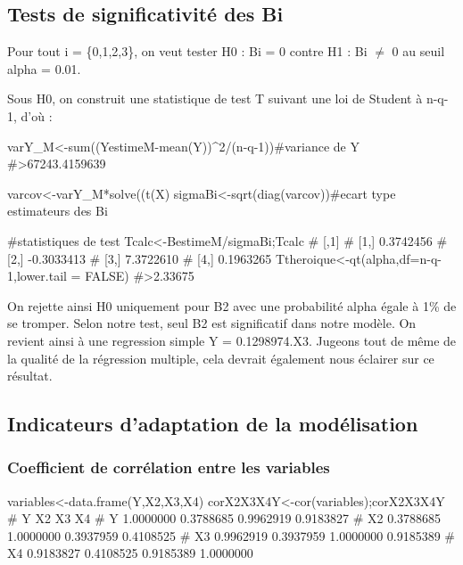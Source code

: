 \hypertarget{tests-de-significativituxe9-des-bi}{%
\subsection{Tests de significativité des
Bi}\label{tests-de-significativituxe9-des-bi}}

Pour tout i = \{0,1,2,3\}, on veut tester H0 : Bi = 0 contre H1 : Bi
\(\neq\) 0 au seuil alpha = 0.01.

Sous H0, on construit une statistique de test T suivant une loi de
Student à n-q-1, d'où :

\begin{Schunk}
\begin{Sinput}
varY_M<-sum((YestimeM-mean(Y))^2/(n-q-1))#variance de Y
#>67243.4159639

varcov<-varY_M*solve((t(X)%
sigmaBi<-sqrt(diag(varcov))#ecart type estimateurs des Bi

#statistiques de test
Tcalc<-BestimeM/sigmaBi;Tcalc
#            [,1]
# [1,]  0.3742456
# [2,] -0.3033413
# [3,]  7.3722610
# [4,]  0.1963265
Ttheroique<-qt(alpha,df=n-q-1,lower.tail = FALSE)
#>2.33675
\end{Sinput}
\end{Schunk}

On rejette ainsi H0 uniquement pour B2 avec une probabilité alpha égale
à 1\% de se tromper. Selon notre test, seul B2 est significatif dans
notre modèle. On revient ainsi à une regression simple Y = 0.1298974.X3.
Jugeons tout de même de la qualité de la régression multiple, cela
devrait également nous éclairer sur ce résultat.

\hypertarget{indicateurs-dadaptation-de-la-moduxe9lisation}{%
\subsection{Indicateurs d'adaptation de la
modélisation}\label{indicateurs-dadaptation-de-la-moduxe9lisation}}

\hypertarget{coefficient-de-corruxe9lation-entre-les-variables}{%
\subsubsection{Coefficient de corrélation entre les
variables}\label{coefficient-de-corruxe9lation-entre-les-variables}}

\begin{Schunk}
\begin{Sinput}
variables<-data.frame(Y,X2,X3,X4)
corX2X3X4Y<-cor(variables);corX2X3X4Y
#            Y        X2        X3        X4
# Y  1.0000000 0.3788685 0.9962919 0.9183827
# X2 0.3788685 1.0000000 0.3937959 0.4108525
# X3 0.9962919 0.3937959 1.0000000 0.9185389
# X4 0.9183827 0.4108525 0.9185389 1.0000000
\end{Sinput}
\end{Schunk}

